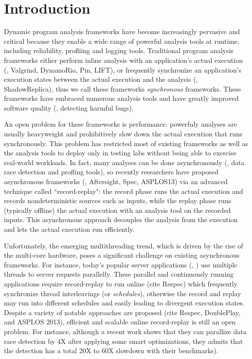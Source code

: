 \section{Introduction} \label{sec:intro}



Dynamic program analysis frameworks have become increasingly pervasive and 
critical because they enable a wide range of powerful analysis tools at 
runtime, including reliability, profliing and logging tools. 
Traditional program analysis frameworks either perform inline analysis with an 
application's actual execution (\eg, Valgrind, DynamoRio, Pin, LIFT), or 
frequently synchronize an application's execution states between the actual 
execution and the analysis (\eg, ShadowReplica), thus we call these frameworks 
\emph{synchronous} frameworks. These frameworks have embraced numerous analysis 
tools and have greatly improved software quality (\eg, detecting harmful bugs).


An open problem for these frameworks is performance: powerfuly analyses are 
usually heavyweight and prohibitively slow down the actual execution that 
runs synchronously. This problem has restricted most of existing frameworks as 
well as the analysis tools to deploy only in testing labs without being able 
to exercise real-world workloads. In fact, many analyses can be done 
asynchronously (\eg, data race detection and profling tools), so recently 
researchers have proposed asynchronous frameworks (\eg, Aftersight, Spec, 
ASPLOS13) via an advanced technique called ``record-replay": the record 
phase runs the actual execution and records nondeterministic sources such as 
inputs, while the replay phase runs (typically offline) the actual execution 
with an analysis tool on the recorded inputs. This asynchronous approach 
decouples the analysis from the execution and lets the actual execution run 
efficiently.


Unfortunately, the emerging multithreading trend, which is driven by the rise 
of the multi-core hardware, poses a significant challenge on existing 
asynchronous frameworks. For instance, today's popular server applications 
(\eg, \apache) use multiple threads to server requests parallelly. These 
parallel and continuously running applications require record-replay to run 
online (cite Respec) which frequently synchronize thread interleavings (or 
\emph{schedules}), otherwise the record and replay may run into different 
schedules and easily leading to divergent execution states. Despite a variety 
of notable approaches are proposed (cite Respec, DoublePlay, and ASPLOS 2013), 
efficient and scalable online record-replay is still an open problem. For 
instance, although a recent work shows that they can parallize data race 
detection by 4X after applying some smart optimizations, they admits that the 
detection has a total 20X to 60X slowdown with their benchmarks).


